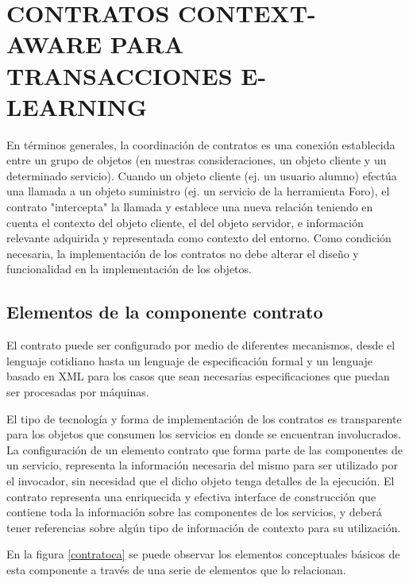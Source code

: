 \section{CONTRATOS CONTEXT-AWARE PARA TRANSACCIONES E-LEARNING} \label{contrato}

En términos generales, la coordinación de contratos es una conexión establecida
entre un grupo de objetos (en nuestras consideraciones, un objeto cliente y un
determinado servicio). Cuando un objeto cliente (ej. un usuario alumno) efectúa
una llamada a un objeto suministro (ej. un servicio de la herramienta Foro), el
contrato "intercepta" la llamada y establece una nueva relación teniendo en
cuenta el contexto del objeto cliente, el del objeto servidor, e información
relevante adquirida y representada como contexto del entorno. Como condición
necesaria, la implementación de los contratos no debe alterar el diseño y
funcionalidad en la implementación de los objetos.


\subsection {Elementos de la componente contrato}

El contrato puede ser configurado por medio de diferentes mecanismos, desde el
lenguaje cotidiano hasta un lenguaje de especificación formal y un lenguaje
basado en XML para los casos que sean necesarias especificaciones que puedan ser
procesadas por máquinas. 

El tipo de tecnología y forma de implementación de los contratos es transparente
para los objetos que consumen los servicios en donde se encuentran involucrados.
La configuración de un elemento contrato que forma parte de  las componentes de
un servicio, representa la información necesaria del mismo para ser utilizado
por el invocador, sin necesidad que el dicho objeto tenga detalles de la
ejecución.
El contrato representa una enriquecida y efectiva interface de construcción que
contiene toda la información sobre las componentes de los servicios, y deberá
tener referencias sobre algún tipo de información de contexto para su
utilización.

En la figura \ref{contratoca} se puede observar los elementos conceptuales
básicos de esta componente a través de una serie de elementos que lo relacionan.

